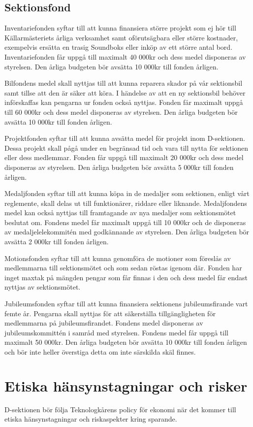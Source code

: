 \documentclass{dsekprotokoll}
\begin{document}
\subsection{Sektionsfond}
Inventariefonden syftar till att kunna finansiera större projekt som ej hör till Källarmästeriets årliga verksamhet samt oförutsägbara eller större kostnader, exempelvis ersätta en trasig Soundboks eller inköp av ett större antal bord. Inventariefonden får uppgå till maximalt 40 000kr och dess medel disponeras av styrelsen. Den årliga budgeten bör avsätta 10 000kr till fonden årligen.

Bilfondens medel skall nyttjas till att kunna reparera skador på vår sektionsbil samt tillse att den är säker att köra. I händelse av att en ny sektionsbil behöver införskaffas kan pengarna ur fonden också nyttjas. Fonden får maximalt uppgå till 60 000kr och dess medel disponeras av styrelsen. Den årliga budgeten bör avsätta 10 000kr till fonden årligen.

Projektfonden syftar till att kunna avsätta medel för projekt inom D-sektionen. Dessa projekt skall pågå under en begränsad tid och vara till nytta för sektionen eller dess medlemmar. Fonden får uppgå till maximalt 20 000kr och dess medel disponeras av styrelsen. Den årliga budgeten bör avsätta 5 000kr till fonden årligen.

Medaljfonden syftar till att kunna köpa in de medaljer som sektionen, enligt vårt reglemente, skall delas ut till funktionärer, riddare eller liknande. Medaljfondens medel kan också nyttjas till framtagande av nya medaljer som sektionsmötet beslutat om. Fondens medel får maximalt uppgå till 10 000kr och de disponeras av medaljelelekommitén med godkännande av styrelsen. Den årliga budgeten bör avsätta 2 000kr till fonden årligen.

Motionsfonden syftar till att kunna genomföra de motioner som föreslås av medlemmarna till sektionsmötet och som sedan röstas igenom där. Fonden har inget maxtak på mängden pengar som får finnas i den och dess medel får endast nyttjas av sektionsmötet.

Jubileumsfonden syftar till att kunna finansiera sektionens jubileumsfirande vart femte år. Pengarna skall nyttjas för att säkerställa tillgängligheten för medlemmarna på jubileumsfirandet. Fondens medel disponeras av jubileumskommittén i samråd med styrelsen. Fondens medel får uppgå till maximalt 50 000kr. Den årliga budgeten bör avsätta 10 000kr till fonden årligen och bör inte heller överstiga detta om inte särskilda skäl finnes.

\section{Etiska hänsynstagningar och risker}

D-sektionen bör följa Teknologkårens policy för ekonomi när det kommer till etiska hänsynstagningar och riskaspekter kring sparande.
\end{document}
